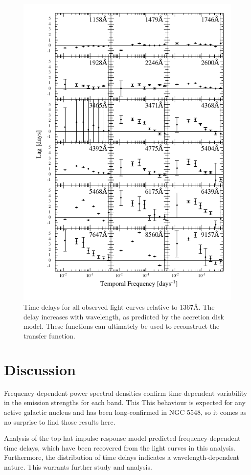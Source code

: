 \documentclass[11pt,letterpaper]{article}
\begin{document}
    \begin{figure}
        \centering
        \includegraphics[width=.9\textwidth]{../img/timelag_atlas.pdf}
        \caption{Time delays for all observed light curves relative to 1367\AA. The delay increases with wavelength, as predicted by the accretion disk model. These functions can ultimately be used to reconstruct the transfer function.}
        \label{timelag_atlas}
    \end{figure}

\section{Discussion}

Frequency-dependent power spectral densities confirm time-dependent variability in the emission strengths for each band. This  This behaviour is expected for any active galactic nucleus and has been long-confirmed in NGC 5548, so it comes as no surprise to find those results here.

Analysis of the top-hat impulse response model predicted frequency-dependent time delays, which have been recovered from the light curves in this analysis. Furthermore, the distribution of time delays indicates a wavelength-dependent nature. This warrants further study and analysis.
\end{document}
